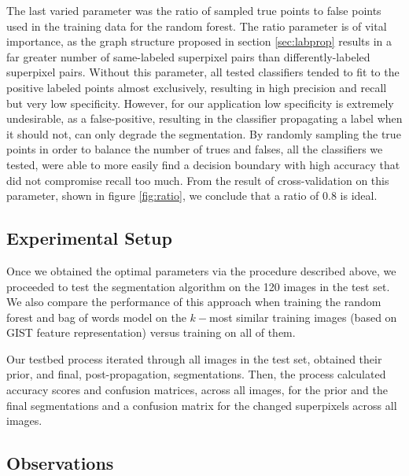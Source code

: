 \documentclass{article} %
\begin{document}
The last varied parameter was the ratio of sampled true points to false points used in the training data for the random forest.
The ratio parameter is of vital importance, as the graph structure proposed in section \ref{sec:labprop} results in a far greater number of same-labeled superpixel pairs than differently-labeled superpixel pairs.
Without this parameter, all tested classifiers tended to fit to the positive labeled points almost exclusively, resulting in high precision and recall but very low specificity. 
However, for our application low specificity is extremely undesirable, as a false-positive, resulting in the classifier propagating a label when it should not, can only degrade the segmentation. By randomly sampling the true points in order to balance the number of trues and falses, all the classifiers we tested, were able to more easily find a decision boundary with high accuracy that did not compromise recall too much.  
From the result of cross-validation on this parameter, shown in figure \ref{fig:ratio}, we conclude that a ratio of 0.8 is ideal.


\subsection{Experimental Setup}

Once we obtained the optimal parameters via the procedure described above, we proceeded to test the segmentation algorithm on the 120 images in the test set. We also compare the performance of this approach when training the random forest and bag of words model on the $k-$most similar training images (based on GIST feature representation) versus training on all of them.

Our testbed process iterated through all images in the test set, obtained their prior, and final, post-propagation, segmentations. Then, the process calculated accuracy scores and confusion matrices, across all images, for the prior and the final segmentations and a confusion matrix for the changed superpixels across all images. 

\subsection{Observations}
\label{sec:Observations}
\end{document}
